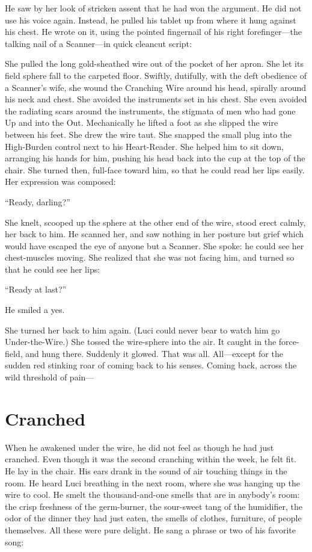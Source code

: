 He saw by her look of stricken assent that he had won the argument. He did not use his voice again. Instead, he pulled his tablet up from where it hung against his chest. He wrote on it, using the pointed fingernail of his right forefinger---the talking nail of a Scanner---in quick cleancut script: 

She pulled the long gold-sheathed wire out of the pocket of her apron. She let its field sphere fall to the carpeted floor. Swiftly, dutifully, with the deft obedience of a Scanner's wife, she wound the Cranching Wire around his head, spirally around his neck and chest. She avoided the instruments set in his chest. She even avoided the radiating scars around the instruments, the stigmata of men who had gone Up and into the Out. Mechanically he lifted a foot as she slipped the wire between his feet. She drew the wire taut. She snapped the small plug into the High-Burden control next to his Heart-Reader. She helped him to sit down, arranging his hands for him, pushing his head back into the cup at the top of the chair. She turned then, full-face toward him, so that he could read her lips easily. Her expression was composed:

``Ready, darling?''

She knelt, scooped up the sphere at the other end of the wire, stood erect calmly, her back to him. He scanned her, and saw nothing in her posture but grief which would have escaped the eye of anyone but a Scanner. She spoke: he could see her chest-muscles moving. She realized that she was not facing him, and turned so that he could see her lips:

``Ready at last?''

He smiled a yes.

She turned her back to him again. (Luci could never bear to watch him go Under-the-Wire.) She tossed the wire-sphere into the air. It caught in the force-field, and hung there. Suddenly it glowed. That was all. All---except for the sudden red stinking roar of coming back to his senses. Coming back, across the wild threshold of pain---

 
\section{Cranched}

When he awakened under the wire, he did not feel as though he had just cranched. Even though it was the second cranching within the week, he felt fit. He lay in the chair. His ears drank in the sound of air touching things in the room. He heard Luci breathing in the next room, where she was hanging up the wire to cool. He smelt the thousand-and-one smells that are in anybody's room: the crisp freshness of the germ-burner, the sour-sweet tang of the humidifier, the odor of the dinner they had just eaten, the smells of clothes, furniture, of people themselves. All these were pure delight. He sang a phrase or two of his favorite song:

